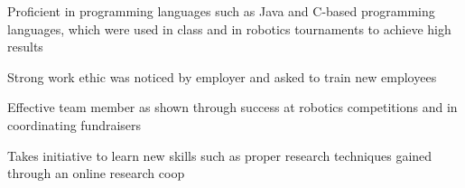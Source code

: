  \begin{cvitems}
    \item {Proficient in programming languages such as Java and C-based programming languages, which were used in class and in robotics tournaments to achieve high results}
    \item {Strong work ethic was noticed by employer and asked to train new employees}
     \item {Effective team member as shown through success at robotics competitions and in coordinating fundraisers}
        \item{Takes initiative to learn new skills such as proper research techniques gained through an online research coop}
      \end{cvitems}

